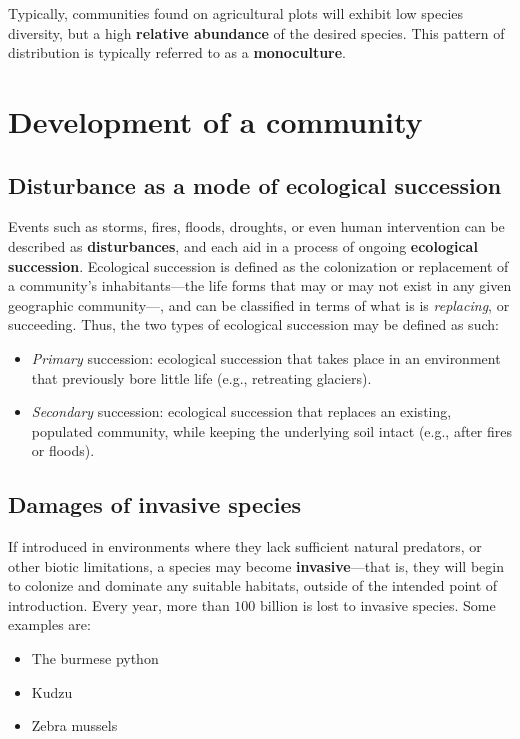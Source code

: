 \documentclass{article}
\begin{document}
Typically, communities found on agricultural plots will exhibit low species
diversity, but a high \textbf{relative abundance} of the desired species. This
pattern of distribution is typically referred to as a \textbf{monoculture}.

\section{Development of a community}

\subsection{Disturbance as a mode of ecological succession}

Events such as storms, fires, floods, droughts, or even human intervention can be
described as \textbf{disturbances}, and each aid in a process of ongoing
\textbf{ecological succession}. Ecological succession is defined as the colonization
or replacement of a community's inhabitants---the life forms that may or may not exist
in any given geographic community---, and can be classified in terms of what is is
\emph{replacing}, or succeeding. Thus, the two types of ecological succession may be
defined as such:

\begin{itemize}
	\item \emph{Primary} succession: ecological succession that takes place in an
	environment that previously bore little life (e.g., retreating glaciers).
  \item \emph{Secondary} succession: ecological succession that replaces an existing,
	populated community, while keeping the underlying soil intact (e.g., after fires
	or floods).
\end{itemize}

\subsection{Damages of invasive species}

If introduced in environments where they lack sufficient natural predators, or other
biotic limitations, a species may become \textbf{invasive}---that is, they will begin
to colonize and dominate any suitable habitats, outside of the intended point of
introduction. Every year, more than $100$ billion is lost to invasive species.
Some examples are:

\begin{itemize}
	\item The burmese python
	\item Kudzu
	\item Zebra mussels
\end{itemize}
\end{document}
